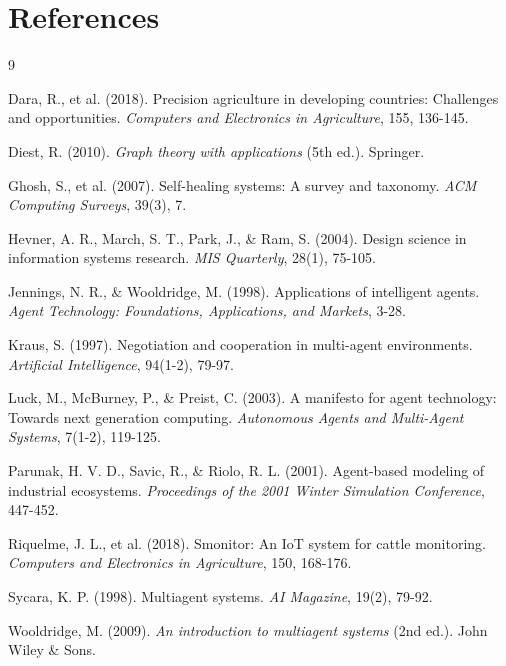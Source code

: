
\chapter*{References}


\begin{thebibliography}{9}

Dara, R., et al. (2018).
Precision agriculture in developing countries: Challenges and opportunities.
\textit{Computers and Electronics in Agriculture}, 155, 136-145.

Diest, R. (2010).
\textit{Graph theory with applications} (5th ed.).
Springer.

Ghosh, S., et al. (2007).
Self-healing systems: A survey and taxonomy.
\textit{ACM Computing Surveys}, 39(3), 7.

Hevner, A. R., March, S. T., Park, J., \& Ram, S. (2004).
Design science in information systems research.
\textit{MIS Quarterly}, 28(1), 75-105.

Jennings, N. R., \& Wooldridge, M. (1998).
Applications of intelligent agents.
\textit{Agent Technology: Foundations, Applications, and Markets}, 3-28.

Kraus, S. (1997).
Negotiation and cooperation in multi-agent environments.
\textit{Artificial Intelligence}, 94(1-2), 79-97.

Luck, M., McBurney, P., \& Preist, C. (2003).
A manifesto for agent technology: Towards next generation computing.
\textit{Autonomous Agents and Multi-Agent Systems}, 7(1-2), 119-125.

Parunak, H. V. D., Savic, R., \& Riolo, R. L. (2001).
Agent-based modeling of industrial ecosystems.
\textit{Proceedings of the 2001 Winter Simulation Conference}, 447-452.

Riquelme, J. L., et al. (2018).
Smonitor: An IoT system for cattle monitoring.
\textit{Computers and Electronics in Agriculture}, 150, 168-176.

Sycara, K. P. (1998).
Multiagent systems.
\textit{AI Magazine}, 19(2), 79-92.

Wooldridge, M. (2009).
\textit{An introduction to multiagent systems} (2nd ed.).
John Wiley \& Sons.

\end{thebibliography}
